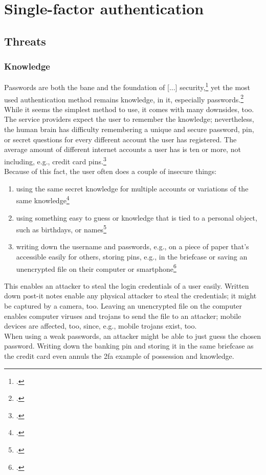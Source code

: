 \chapter{Single-factor authentication}


\section{Threats}
\label{sec:one-factor-threats}

\subsection{Knowledge}

\frqq Passwords are both the bane and the foundation of [...] security\flqq{},\footcite[206]{517355} yet the most used authentication method remains knowledge, in \gls{it}, especially passwords.\footcite[See][424]{320284} While it seems the simplest method to use, it comes with many downsides, too. The service providers expect the user to remember the knowledge; nevertheless, the human brain has difficulty remembering a unique and secure password, \gls{pin}, or secret questions for every different account the user has registered. The average amount of different internet accounts a user has is ten or more, not including, e.g., credit card \glspl{pin}.\footcites[See][7, 9]{lastpass}\\
Because of this fact, the user often does a couple of insecure things:

\begin{enumerate}[label=(\alph*)]
	\item using the same secret knowledge for multiple accounts or variations of the same knowledge\footcites[See][8]{yougov}[See][14]{sweden-passwords}[See][7]{lastpass}
	\item using something easy to guess or knowledge that is tied to a personal object, such as birthdays, or names\footcite[See][]{web-de-passwords}
	\item writing down the username and passwords, e.g., on a piece of paper that's accessible easily for others, storing \glspl{pin}, e.g., in the briefcase or saving an unencrypted file on their computer or smartphone\footcites[See][]{web-de-passwords}[See][6]{yougov2}

\end{enumerate}

This enables an attacker to steal the login credentials of a user easily. Written down post-it notes enable any physical attacker to steal the credentials; it might be captured by a camera, too. Leaving an unencrypted file on the computer enables computer viruses and trojans to send the file to an attacker; mobile devices are affected, too, since, e.g., mobile trojans exist, too.\\
When using a weak passwords, an attacker might be able to just guess the chosen password. Writing down the banking \gls{pin} and storing it in the same briefcase as the credit card even annuls the \gls{2fa} example of possession and knowledge.

